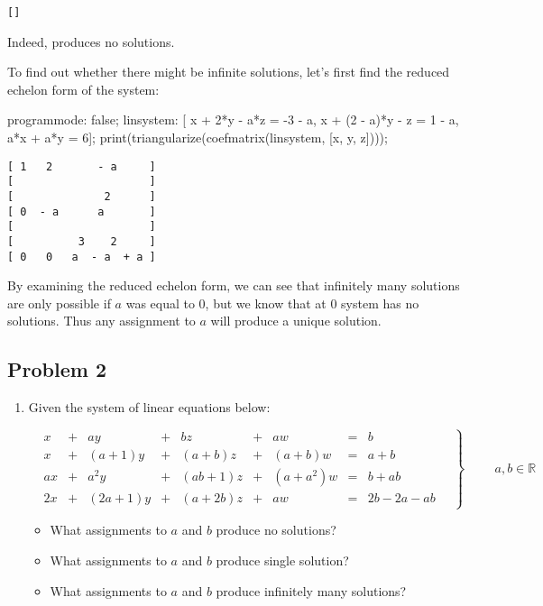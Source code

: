 \documentclass[11pt]{article}
\begin{document}
\begin{verbatim}
[] 
\end{verbatim}

Indeed, produces no solutions.

To find out whether there might be infinite solutions, let's first find
the reduced echelon form of the system:

\begin{maxima}
programmode: false;
linsystem: [  x + 2*y       - a*z = -3 - a,
              x + (2 - a)*y -   z = 1  - a,
            a*x + a*y             = 6];
print(triangularize(coefmatrix(linsystem, [x, y, z])));
\end{maxima}

\begin{verbatim}
[ 1   2       - a     ]
[                     ]
[              2      ]
[ 0  - a      a       ] 
[                     ]
[          3    2     ]
[ 0   0   a  - a  + a ]
\end{verbatim}

By examining the reduced echelon form, we can see that infinitely many
solutions are only possible if $a$ was equal to 0, but we know that at 0
system has no solutions.  Thus any assignment to $a$ will produce a unique
solution.
\subsection{Problem 2}
\label{sec-1-2}

\begin{enumerate}
\item Given the system of linear equations below:

\begin{equation*}
  \left.
    \begin{alignedat}{5}
      &  x & {}+{} & ay        & {}+{} & bz        & {}+{} & aw         & {}={} & b \\
      &  x & {}+{} & (a + 1)y  & {}+{} & (a + b)z  & {}+{} & (a + b)w   & {}={} & a + b \\
      & ax & {}+{} & a^2y      & {}+{} & (ab + 1)z & {}+{} & (a + a^2)w & {}={} & b + ab \\
      & 2x & {}+{} & (2a + 1)y & {}+{} & (a + 2b)z & {}+{} & aw         & {}={} & 2b - 2a - ab
    \end{alignedat}
  \quad \right\} \qquad
  \begin{aligned}
    a, b \in \mathbb{R}
  \end{aligned}
\end{equation*}

\begin{itemize}
\item What assignments to $a$ and $b$ produce no solutions?
\item What assignments to $a$ and $b$ produce single solution?
\item What assignments to $a$ and $b$ produce infinitely many solutions?
\end{itemize}
\end{enumerate}
\end{document}
